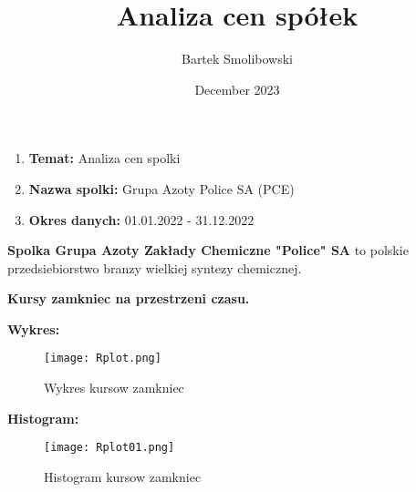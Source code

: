 \documentclass{article}
\begin{document}
\title{Analiza cen spółek}

\author{Bartek Smolibowski}

\date{December 2023}

\begin{enumerate}
    \item \textbf{Temat: }Analiza cen spolki
    \item \textbf{Nazwa spolki:} Grupa Azoty Police SA (PCE)
    \item \textbf{Okres danych:} 01.01.2022 - 31.12.2022
\end{enumerate}

\textbf{Spolka Grupa Azoty Zakłady Chemiczne "Police" SA} to polskie przedsiebiorstwo branzy wielkiej syntezy chemicznej.

\vspace{12pt} %

\textbf{Kursy zamkniec na przestrzeni czasu.}

\vspace{12pt}

\textbf{Wykres:}
\begin{figure}[h]
    \centering
    \texttt{[image: Rplot.png]}
    \caption{Wykres kursow zamkniec}
    \label{fig:enter-label}
\end{figure}

\textbf{Histogram:}

\vspace{12pt}

\begin{figure}[h]
    \centering
    \texttt{[image: Rplot01.png]}
    \caption{Histogram kursow zamkniec}
    \label{fig:enter-label2}
\end{figure}

\hrulefill
\end{document}
